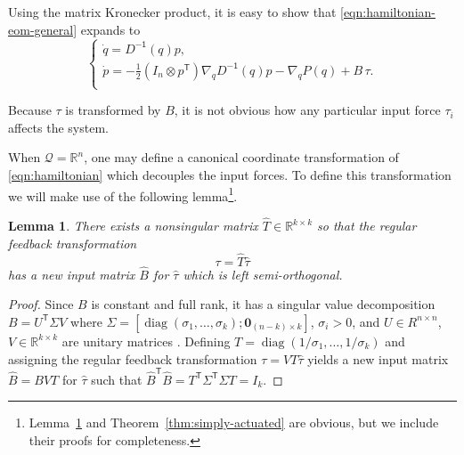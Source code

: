 \documentclass[journal,twoside,web, twocolumn]{ieeecolor}
\newtheorem{lemma}{Lemma} %
\DeclareMathOperator{\Diag}{diag}
\newcommand*{\diag}[1]{\Diag\left(#1\right)}
\newcommand*{\tpose}{^\mathsf{T}}
\newcommand*{\inv}{^\mathsf{-1}}
\newcommand*{\R}{\mathbb{R}}
\newcommand*{\Id}[1]{I_{#1}}
\newcommand*{\Zmat}[1]{\bm{0}_{#1}}
\begin{document}
Using the matrix Kronecker product, it is easy to show that
\eqref{eqn:hamiltonian-eom-general} expands to
\begin{equation*}\label{eqn:hamiltonian-full-dynamics}
     \begin{cases}
        \dot{q} = D\inv(q)p 
        , \\
        \dot{p} = -\frac{1}{2} (\Id{n} \otimes p\tpose) \nabla_q D\inv(q) p
        - \nabla_q P(q) + B \,\tau
        . \\
    \end{cases}
\end{equation*}

Because \(\tau\) is transformed by \(B\), it is not obvious how any particular input force \(\tau_i\) affects the system.

When \(\mathcal{Q} = \R^n\), one may define a canonical coordinate transformation of \eqref{eqn:hamiltonian} which decouples the input forces. To define this transformation we will make use of the following lemma\footnote{Lemma~\ref{lemma:B-orthogonal} and Theorem~\ref{thm:simply-actuated} are obvious, but we include their proofs for completeness.}.

\begin{lemma}\label{lemma:B-orthogonal}
There exists a nonsingular matrix \(\hat{T} \in \R^{k \times k}\) 
    so that the regular feedback transformation 
    \[
        \tau = \hat{T} \hat{\tau}
    \] 
    has a new input matrix \(\hat{B}\) for \(\hat{\tau}\) which is left
    semi-orthogonal.  
\end{lemma}
\begin{proof}
    Since \(B\) is constant and full rank, it has a singular value decomposition 
    \(B = U\tpose \Sigma V\) where 
    \(\Sigma = [\diag{\sigma_1,\ldots,\sigma_k}; \Zmat{(n-k)\times k}]\),
    \(\sigma_i > 0\), and \(U \in R^{n \times n}\),
    \(V \in \R^{k \times k}\) are unitary matrices \cite{calculating_svd}.
    Defining \(T = \diag{1/\sigma_1,\ldots,1/\sigma_k}\) and assigning the
    regular feedback transformation \(\tau = V T \hat{\tau}\) yields a new input
    matrix \(\hat{B} = B V T\) for \(\hat{\tau}\) such that
    \(\hat{B}\tpose \hat{B} = T\tpose \Sigma\tpose \Sigma T = \Id{k}\).
\end{proof}
\end{document}
